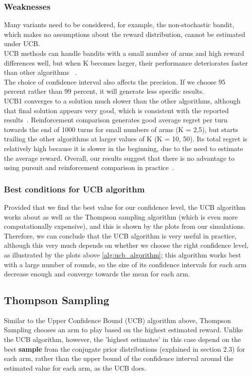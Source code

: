 \subsubsection{Weaknesses}
Many variants need to be considered, for example, the non-stochastic bandit, which makes no assumptions about the reward distribution, cannot be estimated under UCB\@.
\\UCB methods can handle bandits with a small number of arms and high reward differences well, but when K becomes larger, their performance deteriorates faster than other algorithms ~\citep{Kuleshov}.
\\The choice of confidence interval also affects the precision.
If we choose 95 percent rather than 99 percent, it will generate less specific results.
\\UCB1 converges to a solution much slower than the other algorithms, although that final solution appears very good, which is consistent with the reported results~\citep{Auer2002}.
Reinforcement comparison generates good average regret per turn towards the end of 1000 turns for small numbers of arms (K = 2,5), but starts trailing the other algorithms at larger values of K (K = 10, 50).
Its total regret is relatively high because it is slower in the beginning, due to the need to estimate the average reward.
Overall, our results suggest that there is no advantage to using pursuit and reinforcement comparison in practice~\citep{Kuleshov}.

\subsubsection{Best conditions for UCB algorithm}
Provided that we find the best value for our confidence level, the UCB algorithm works about as well as the Thompson sampling algorithm (which is even more computationally expensive), and this is shown by the plots from our simulations. 
Therefore, we can conclude that the UCB algorithm is very useful in practice, although this very much depends on whether we choose the right confidence level, as illustrated by the plots above \ref{alg:ucb_algorithm}; this algorithm works best with a large number of rounds, so the size of its confidence intervals for each arm decrease enough and converge towards the mean for each arm.

\subsection{Thompson Sampling}\label{subsec:thompson-sampling}
Similar to the Upper Confidence Bound (UCB) algorithm above, Thompson Sampling chooses an arm to play based on the highest estimated reward.
Unlike the UCB algorithm, however, the 'highest estimates' in this case depend on the best \textbf{sample} from the conjugate prior distributions (explained in section 2.3) for each arm, rather than the upper bound of the confidence interval around the estimated value for each arm, as the UCB does.

